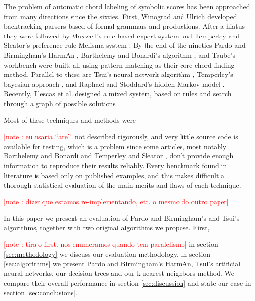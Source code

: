 \documentclass{article}
\newcounter{notecounter}
\newcommand{\note}[1]{
  \addtocounter{notecounter}{1}
  \textcolor{red}{[note \arabic{notecounter}: #1]}
}
\begin{document}
The problem of automatic chord labeling of symbolic scores has been
approached from many directions since the sixties. First, Winograd
\cite{winograd68:linguistics} and Ulrich \cite{ulrich77:analysis}
developed backtracking parsers based of formal grammars and
productions. After a hiatus they were followed by Maxwell's
\cite{maxwell92:expert} rule-based expert system and Temperley and
Sleator's preference-rule Melisma system
\cite{temperley.ea99:modeling}. By the end of the nineties Pardo and
Birmingham's HarmAn \cite{barthelemy.ea01:figured}, Barthelemy and
Bonardi's algorithm \cite{pardo.ea02:algorithms}, and Taube's
workbench \cite{taube99:automatic} were built, all using
pattern-matching as their core chord-finding method. Parallel to these
are Tsui's neural network algorithm \cite{tsui02:harmonic}, Temperley's
bayesian approach \cite{temperley04:bayesian}, and Raphael and
Stoddard's hidden Markov model \cite{raphael.ea03:harmonic}. Recently,
Illescas et al. designed a mixed system, based on rules and search
through a graph of possible solutions \cite{illescas.ea07:harmonic}.

Most of these techniques and methods were \note{eu usaria ``are''} not
described rigorously, and very little source code is available for
testing, which is a problem since some articles, most notably
Barthelemy and Bonardi \cite{pardo.ea02:algorithms} and Temperley and
Sleator \cite{temperley.ea99:modeling}, don't provide enough
information to reproduce their results reliably. Every benchmark found
in literature \cite{pardo.ea00:automated, pardo.ea02:algorithms,
  tsui02:harmonic, taube99:automatic, illescas.ea07:harmonic} is based
only on published examples, and this makes difficult a thorough
statistical evaluation of the main merits and flaws of each technique.
\note{dizer que estamos re-implementando, etc. o mesmo do outro paper}

In this paper we present an evaluation of Pardo and Birmingham's and
Tsui's algorithms, together with two original algorithms we propose.
First, \note{tira o first. nos enumeramos quando tem paralelismo} in
section \ref{sec:methodology} we discuss our evaluation methodology.
In section \ref{sec:algorithms} we present Pardo and Birmingham's
HarmAn, Tsui's artificial neural networks, our decision trees and our
k-nearest-neighbors method. We compare their overall performance in
section \ref{sec:discussion} and state our case in section
\ref{sec:conclusions}.
\end{document}
